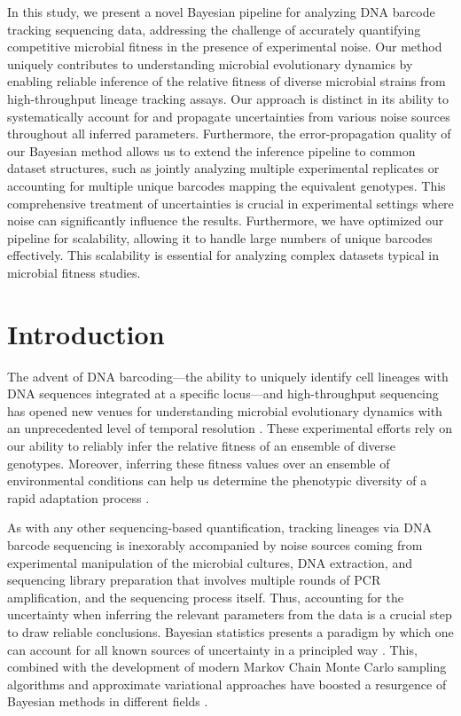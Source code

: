 \documentclass[
]{scrartcl}
\begin{document}
\begin{refsegment}
In this study, we present a novel Bayesian pipeline for analyzing DNA
barcode tracking sequencing data, addressing the challenge of accurately
quantifying competitive microbial fitness in the presence of
experimental noise. Our method uniquely contributes to understanding
microbial evolutionary dynamics by enabling reliable inference of the
relative fitness of diverse microbial strains from high-throughput
lineage tracking assays. Our approach is distinct in its ability to
systematically account for and propagate uncertainties from various
noise sources throughout all inferred parameters. Furthermore, the
error-propagation quality of our Bayesian method allows us to extend the
inference pipeline to common dataset structures, such as jointly
analyzing multiple experimental replicates or accounting for multiple
unique barcodes mapping the equivalent genotypes. This comprehensive
treatment of uncertainties is crucial in experimental settings where
noise can significantly influence the results. Furthermore, we have
optimized our pipeline for scalability, allowing it to handle large
numbers of unique barcodes effectively. This scalability is essential
for analyzing complex datasets typical in microbial fitness studies.

\hypertarget{introduction}{%
\section{Introduction}\label{introduction}}

The advent of DNA barcoding---the ability to uniquely identify cell
lineages with DNA sequences integrated at a specific locus---and
high-throughput sequencing has opened new venues for understanding
microbial evolutionary dynamics with an unprecedented level of temporal
resolution \autocite{levy2015,nguyenba2019a,ascensao2023}. These
experimental efforts rely on our ability to reliably infer the relative
fitness of an ensemble of diverse genotypes. Moreover, inferring these
fitness values over an ensemble of environmental conditions can help us
determine the phenotypic diversity of a rapid adaptation process
\autocite{kinsler2020}.

As with any other sequencing-based quantification, tracking lineages via
DNA barcode sequencing is inexorably accompanied by noise sources coming
from experimental manipulation of the microbial cultures, DNA
extraction, and sequencing library preparation that involves multiple
rounds of PCR amplification, and the sequencing process itself. Thus,
accounting for the uncertainty when inferring the relevant parameters
from the data is a crucial step to draw reliable conclusions. Bayesian
statistics presents a paradigm by which one can account for all known
sources of uncertainty in a principled way \autocite{eddy2004a}. This,
combined with the development of modern Markov Chain Monte Carlo
sampling algorithms \autocite{betancourt2017} and approximate
variational approaches \autocite{kucukelbir2016} have boosted a
resurgence of Bayesian methods in different fields
\autocite{efron2013a}.


\end{refsegment}
\end{document}
